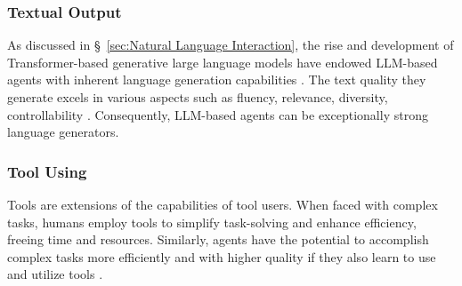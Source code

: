 
\subsubsection{Textual Output} \label{sec:Textual Output}

As discussed in \S \ \ref{sec:Natural Language Interaction}, the rise and development of Transformer-based generative large language models have endowed LLM-based agents with inherent language generation capabilities \cite{DBLP:journals/corr/abs-2302-04023, DBLP:journals/corr/abs-2303-12528}. The text quality they generate excels in various aspects such as fluency, relevance, diversity, controllability \cite{DBLP:journals/corr/abs-2305-13711, DBLP:conf/conll/SeePSYM19, DBLP:conf/eacl/LuZZWY23, DBLP:journals/corr/abs-2111-09509}. Consequently, LLM-based agents can be exceptionally strong language generators.

\subsubsection{Tool Using}\label{sec:Tool Using}
Tools are extensions of the capabilities of tool users. When faced with complex tasks, humans employ tools to simplify task-solving and enhance efficiency, freeing time and resources. Similarly, agents have the potential to accomplish complex tasks more efficiently and with higher quality if they also learn to use and utilize tools \cite{DBLP:journals/corr/abs-2304-08354}.

